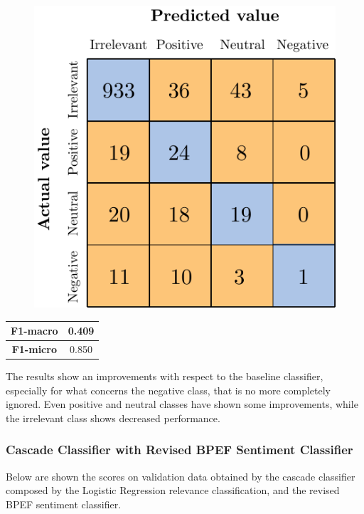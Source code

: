 \begin{figure}[H]
	\centering
	\includegraphics[scale=1]{figures/conf_matrices/ita_cascade_svm/ita_cascade_svm_val.pdf}
	\label{fig:ita_cascade_svm_val}
\end{figure}

\begin{center}
	\begin{tabular}{ | c | c | } 
		\hline
		\textbf{F1-macro} & 0.409 \\
		\hline
		\textbf{F1-micro} & 0.850 \\ 
		\hline
	\end{tabular}
\end{center}

The results show an improvements with respect to the baseline classifier, especially for what concerns the negative class, that is no more completely ignored. Even positive and neutral classes have shown some improvements, while the irrelevant class shows decreased performance. 




\subsubsection{Cascade Classifier with Revised BPEF Sentiment Classifier}

Below are shown the scores on validation data obtained by the cascade classifier composed by the Logistic Regression relevance classification, and the revised BPEF sentiment classifier.

